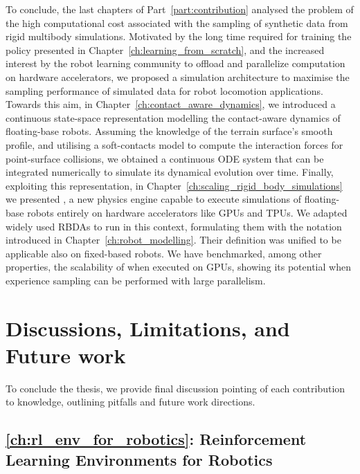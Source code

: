 To conclude, the last chapters of Part~\ref{part:contribution} analysed the problem of the high computational cost associated with the sampling of synthetic data from rigid multibody simulations.
Motivated by the long time required for training the policy presented in Chapter~\ref{ch:learning_from_scratch}, and the increased interest by the robot learning community to offload and parallelize computation on hardware accelerators, we proposed a simulation architecture to maximise the sampling performance of simulated data for robot locomotion applications.
Towards this aim, in Chapter~\ref{ch:contact_aware_dynamics}, we introduced a continuous state-space representation modelling the contact-aware dynamics of floating-base robots.
Assuming the knowledge of the terrain surface's smooth profile, and utilising a soft-contacts model to compute the interaction forces for point-surface collisions, we obtained a continuous \acs{ODE} system that can be integrated numerically to simulate its dynamical evolution over time.
Finally, exploiting this representation, in Chapter~\ref{ch:scaling_rigid_body_simulations} we presented \jaxsim, a new physics engine capable to execute simulations of floating-base robots entirely on hardware accelerators like \acsp{GPU} and \acsp{TPU}.
We adapted widely used \aclp{RBDA} to run in this context, formulating them with the notation introduced in Chapter~\ref{ch:robot_modelling}.
Their definition was unified to be applicable also on fixed-based robots.
We have benchmarked, among other properties, the scalability of \jaxsim when executed on \acp{GPU}, showing its potential when experience sampling can be performed with large parallelism.

\section*{Discussions, Limitations, and Future work}

To conclude the thesis, we provide final discussion pointing of each contribution to knowledge, outlining pitfalls and future work directions.

\subsection*{\autoref{ch:rl_env_for_robotics}: Reinforcement Learning Environments for Robotics}

